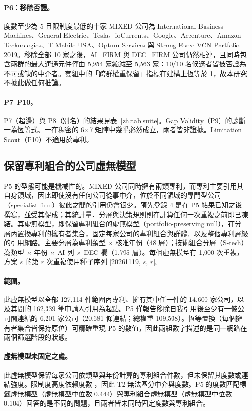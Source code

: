\paragraph{P6：移除否證。} 度數至少為 5 且限制度最低的十家 MIXED 公司為 International Business Machines、General Electric、Tesla、ioCurrents、Google、Accenture、Amazon Technologies、T-Mobile USA、Optum Services 與 Strong Force VCN Portfolio 2019。移除全部 10 家之後，AI\_FIRM 與 DEC\_FIRM 公司仍然相連，且同時包含兩群的最大連通元件僅由 5,954 家縮減至 5,563 家：10/10 名候選者皆被否證為不可或缺的中介者。套組中的「跨群權重保留」指標在建構上恆等於 1，故本研究不據此做任何推論。

\paragraph{P7--P10。} P7（超邊）與 P8（別名）的結果見表~\ref{zh:tab:suite}。Gap Validity（P9）的診斷一為恆等式、一在稠密的 6$\times$7 矩陣中幾乎必然成立，兩者皆非證據。Limitation Scout（P10）不適用於專利。

\subsection{保留專利組合的公司虛無模型}
\label{zh:sec:study2_firm}

P5 的型態可能是機械性的。MIXED 公司同時擁有兩類專利，而專利主要引用其自身領域，因此即使沒有任何公司從事中介，位於不同領域的專門型公司（specialist firm）彼此之間的引用仍會很少。預先登錄 4 是在 P5 結果已知之後撰寫，並受其促成；其統計量、分層與決策規則則在計算任何一次重複之前即已凍結。其虛無模型，即保留專利組合的虛無模型（portfolio-preserving null），在分層內置換專利的擁有者集合，固定每家公司的專利組合與群體，以及整個專利層級的引用網路。主要分層為專利類型 $\times$ 核准年份（48 層）；技術組合分層（S-tech）為類型 $\times$ 年份 $\times$ AI 列 $\times$ DEC 欄（1,795 層）。每個虛無模型有 1,000 次重複，方案 $s$ 的第 $r$ 次重複使用種子序列 [20261119, $s$, $r$]。

\paragraph{範圍。} 此虛無模型以全部 127,114 件範圍內專利、擁有其中任一件的 14,600 家公司，以及其間的 162,339 筆申請人引用為起點。P5 僅報告移除自我引用後至少有一條公司間連結的 6,201 家公司（20,681 條連結；總權重 109,508）。恆等置換（每個擁有者集合皆保持原位）可精確重現 P5 的數值，因此兩組數字描述的是同一網路在兩個篩選階段的狀態。

\paragraph{虛無模型未固定之處。} 此虛無模型保留每家公司依類型與年份計算的專利組合件數，但未保留其度數或連結強度。限制度高度依賴度數 \citep{everett2020unpacking}，因此 T2 無法區分中介與度數。P5 的度數匹配標籤虛無模型（虛無模型中位數 0.444）與專利組合虛無模型（虛無模型中位數 0.104）回答的是不同的問題，且兩者皆未同時固定度數與專利組合。

